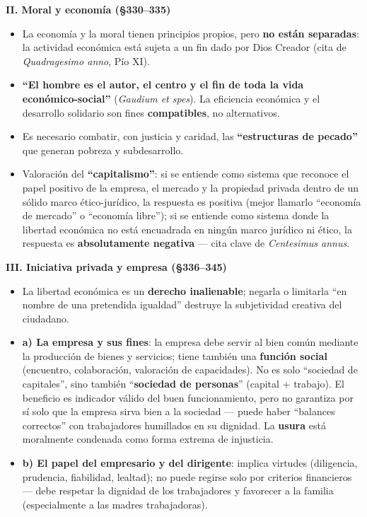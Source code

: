 \documentclass[10pt,a4paper]{article}
\begin{document}
\medskip\noindent \textbf{II. Moral y economía (\S{}330--335)}\par\nopagebreak
\begin{itemize}
\item La economía y la moral tienen principios propios, pero \textbf{no están separadas}: la actividad económica está sujeta a un fin dado por Dios Creador (cita de \textit{Quadragesimo anno}, Pío XI).
\item \textbf{``El hombre es el autor, el centro y el fin de toda la vida económico-social''} (\textit{Gaudium et spes}). La eficiencia económica y el desarrollo solidario son fines \textbf{compatibles}, no alternativos.
\item Es necesario combatir, con justicia y caridad, las \textbf{``estructuras de pecado''} que generan pobreza y subdesarrollo.
\item Valoración del \textbf{``capitalismo''}: si se entiende como sistema que reconoce el papel positivo de la empresa, el mercado y la propiedad privada dentro de un sólido marco ético-jurídico, la respuesta es positiva (mejor llamarlo ``economía de mercado'' o ``economía libre''); si se entiende como sistema donde la libertad económica no está encuadrada en ningún marco jurídico ni ético, la respuesta es \textbf{absolutamente negativa} --- cita clave de \textit{Centesimus annus}.
\end{itemize}

\medskip\noindent \textbf{III. Iniciativa privada y empresa (\S{}336--345)}\par\nopagebreak
\begin{itemize}
\item La libertad económica es un \textbf{derecho inalienable}; negarla o limitarla ``en nombre de una pretendida igualdad'' destruye la subjetividad creativa del ciudadano.
\item \textbf{a) La empresa y sus fines}: la empresa debe servir al bien común mediante la producción de bienes y servicios; tiene también una \textbf{función social} (encuentro, colaboración, valoración de capacidades). No es solo ``sociedad de capitales'', sino también ``\textbf{sociedad de personas}'' (capital + trabajo). El beneficio es indicador válido del buen funcionamiento, pero no garantiza por sí solo que la empresa sirva bien a la sociedad --- puede haber ``balances correctos'' con trabajadores humillados en su dignidad. La \textbf{usura} está moralmente condenada como forma extrema de injusticia.
\item \textbf{b) El papel del empresario y del dirigente}: implica virtudes (diligencia, prudencia, fiabilidad, lealtad); no puede regirse solo por criterios financieros --- debe respetar la dignidad de los trabajadores y favorecer a la familia (especialmente a las madres trabajadoras).
\end{itemize}
\end{document}
